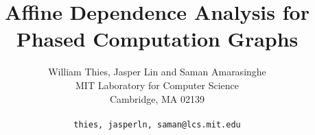 \documentclass[10pt]{article}
\title{Affine Dependence Analysis for Phased Computation Graphs}
\author{William Thies, Jasper Lin and Saman Amarasinghe \\
  MIT Laboratory for Computer Science\\
  Cambridge, MA  02139\\ \\
  \texttt{\symbol{`\{}thies, jasperln, saman\symbol{`\}}@lcs.mit.edu}}
\date{}
\begin{document}
  \maketitle

  \newcommand{\mt}[1]{\mbox{\it #1}}
  \newcommand{\todo}[1]{\framebox{\bf #1}}
  \newcommand{\dep}[0]{Dependence Frontier}                %
  \newcommand{\DP}[0]{\textsc{Frontier}}                   %
  \newcommand{\DEP}[2]{\DP_{#1 \small{\rightarrow} #2}}    %
  \newcommand{\sssection}[1]{\medskip \noindent {\bf #1} \smallskip}

  \begin{abstract}
    
  \end{abstract}

  
  
  
  
  
  
  

\vspace{-18pt}
\begin{small}
  \begin{singlespace}
    
    
  \end{singlespace}
\end{small}

  \newpage
  
  
\end{document}
